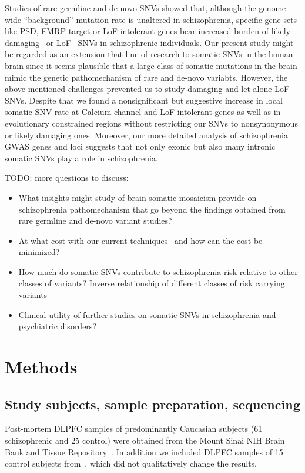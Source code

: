 \documentclass[letterpaper]{article}
\begin{document}
Studies of rare germline and de-novo SNVs showed that, although the
genome-wide ``background'' mutation rate is unaltered in schizophrenia,
specific gene sets like PSD, FMRP-target or LoF intolerant genes bear
increased burden of likely damaging~\citep{Purcell2014} or
LoF~\citep{Singh2017} SNVs in schizophrenic individuals.  Our present study
might be regarded as an extension that line of research to somatic SNVs in the
human brain since it seems plausible that a large class of somatic mutations
in the brain mimic the genetic pathomechanism of rare and de-novo variabts.
However, the above mentioned challenges prevented us to study damaging and let
alone LoF SNVs.  Despite that we found a nonsignificant but suggestive
increase in local somatic SNV rate at Calcium channel and LoF intolerant genes
as well as in evolutionary constrained regions without restricting our SNVs to
nonsynonymous or likely damaging ones.  Moreover, our more detailed analysis
of schizophrenia GWAS genes and loci suggests that not only exonic but also
many intronic somatic SNVs play a role in schizophrenia.

TODO: more questions to discuss:
\begin{itemize}
\item What insights might study of brain somatic mosaicism provide on schizophrenia
pathomechanism that go beyond the findings obtained from rare germline and
de-novo variant studies?  
\item At what cost with our current techniques~\citep{Wang2021} and how can the cost be minimized?  
\item How much do somatic SNVs contribute to schizophrenia risk relative to other
classes of variants?  Inverse relationship of different classes of risk
carrying variants~\citep{Bergen2019}
\item Clinical utility of further studies on somatic SNVs in
schizophrenia and psychiatric disorders?
\end{itemize}


\section*{Methods}

\subsection*{Study subjects, sample preparation, sequencing}

Post-mortem DLPFC samples of predominantly Caucasian subjects (61
schizophrenic and 25 control) were obtained from the Mount Sinai NIH Brain
Bank and Tissue Repository~\citep{Hoffman2019}.  In addition we included DLPFC
samples of 15 control subjects from~\citep{Rodin2021}, which did not
qualitatively change the results.
\end{document}
